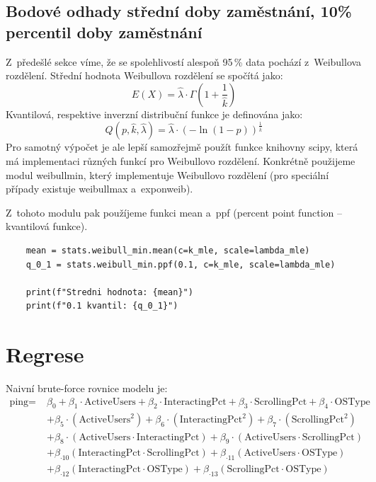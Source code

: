 \documentclass[a4paper, 11pt]{article}
\renewcommand{\texttt}[1]{{\footnotesize\ttfamily #1}}
\begin{document}
\subsection{Bodové odhady střední doby zaměstnání, 10\% percentil doby zaměstnání}

Z~předešlé sekce víme, že se spolehlivostí alespoň 95\,\% data pochází z~Weibullova rozdělení.
Střední hodnota Weibullova rozdělení se spočítá jako:
\[
    E(X) = \hat{\lambda} \cdot \Gamma \left(1 + \frac{1}{\hat{k}} \right)
\]  
Kvantilová, respektive inverzní distribuční funkce je definována jako:
\[
    Q(p, \hat{k}, \hat{\lambda}) = \hat{\lambda} \cdot \left( -\ln(1-p) \right)^{\frac{1}{\hat{k}}}
\]
Pro samotný výpočet je ale lepší samozřejmě použít funkce knihovny \texttt{scipy}, která má implementaci různých funkcí pro Weibullovo rozdělení.
Konkrétně použijeme modul \texttt{weibull\textunderscore min}, který implementuje  Weibullovo rozdělení (pro speciální případy existuje \texttt{weibull\textunderscore max} a~\texttt{exponweib}).

Z~tohoto modulu pak použíjeme funkci \texttt{mean} a~\texttt{ppf} (percent point function -- kvantilová funkce).

\begin{verbatim}
    mean = stats.weibull_min.mean(c=k_mle, scale=lambda_mle)
    q_0_1 = stats.weibull_min.ppf(0.1, c=k_mle, scale=lambda_mle)

    print(f"Stredni hodnota: {mean}")
    print(f"0.1 kvantil: {q_0_1}")
\end{verbatim}

\section{Regrese}

Naivní brute-force rovnice modelu je:
\begin{align*}
    \text{ping} =\;&\beta_0 + \beta_1 \cdot \text{ActiveUsers} + \beta_2 \cdot \text{InteractingPct} + \beta_3 \cdot \text{ScrollingPct} + \beta_4 \cdot \text{OSType}  \\
    &+ \beta_5 \cdot (\text{ActiveUsers}^2) + \beta_6 \cdot (\text{InteractingPct}^2) + \beta_7 \cdot (\text{ScrollingPct}^2)  \\ 
    &+ \beta_8 \cdot (\text{ActiveUsers} \cdot \text{InteractingPct}) + \beta_9 \cdot (\text{ActiveUsers} \cdot \text{ScrollingPct})  \\ 
    &+ \beta_{ \cdot10} (\text{InteractingPct} \cdot \text{ScrollingPct}) + \beta_{ \cdot11} (\text{ActiveUsers} \cdot \text{OSType})  \\
    &+ \beta_{ \cdot12} (\text{InteractingPct} \cdot \text{OSType}) + \beta_{ \cdot13} (\text{ScrollingPct} \cdot \text{OSType})
\end{align*}
\end{document}
